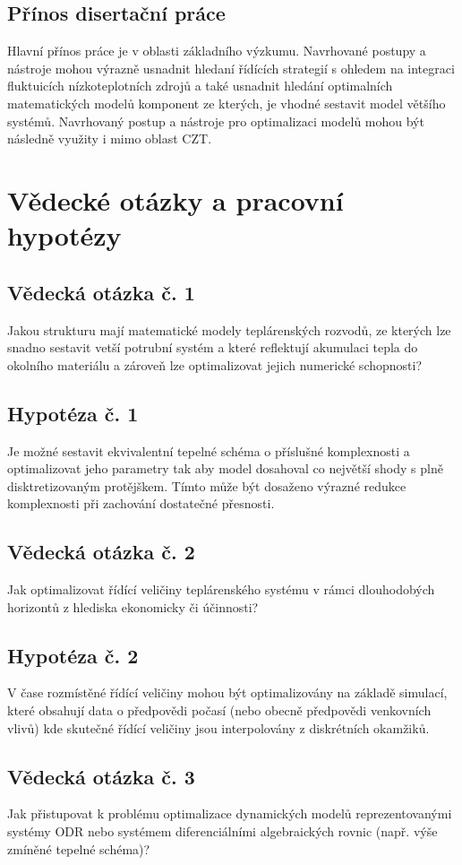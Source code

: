 \section{Přínos disertační práce}
\label{sec:prinos}
Hlavní přínos práce je v oblasti základního výzkumu. Navrhované postupy a
nástroje mohou výrazně usnadnit hledaní řídících strategií s ohledem na
integraci fluktuicích nízkoteplotních zdrojů a také usnadnit hledání
optimalních matematických modelů komponent ze kterých, je vhodné sestavit model
většího systémů. Navrhovaný postup a nástroje pro optimalizaci modelů mohou být
následně využity i mimo oblast CZT.

\chapter{Vědecké otázky a pracovní hypotézy}
\label{chap:SciQaH}
\section*{Vědecká otázka č. 1}
Jakou strukturu mají matematické modely teplárenských rozvodů, ze kterých lze
snadno sestavit vetší potrubní systém a které reflektují akumulaci tepla do
okolního materiálu a zároveň lze optimalizovat jejich numerické schopnosti?
\section*{Hypotéza č. 1}
Je možné sestavit ekvivalentní tepelné schéma o příslušné komplexnosti a
optimalizovat jeho parametry tak aby model dosahoval co největší shody s plně
disktretizovaným protějškem. Tímto může být dosaženo výrazné redukce
komplexnosti při zachování dostatečné přesnosti.
\section*{Vědecká otázka č. 2}
Jak optimalizovat řídící veličiny teplárenského systému v rámci dlouhodobých
horizontů z hlediska ekonomicky či účinnosti?
\section*{Hypotéza č. 2}
V čase rozmístěné řídící veličiny mohou být optimalizovány na základě simulací,
které obsahují data o předpovědi počasí (nebo obecně předpovědi venkovních
vlivů) kde skutečné řídící veličiny jsou interpolovány z diskrétních okamžiků.
\section*{Vědecká otázka č. 3}
Jak přistupovat k problému optimalizace dynamických modelů reprezentovanými
systémy ODR nebo systémem diferenciálními algebraických rovnic (např. výše
zmíněné tepelné schéma)?
